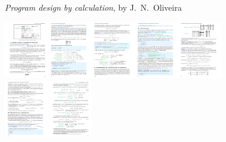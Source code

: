 \begin{figure}
\begin{centering}
\emph{Program design by calculation}, by J.~N.~Oliveira
\par\end{centering}
\begin{centering}
\vspace{1\baselineskip}
\par\end{centering}
\begin{centering}
\includegraphics[height=2.51cm]{random-pages/random-pages-from-sofp-pdf-00}\includegraphics[height=2.51cm]{random-pages/random-pages-from-sofp-pdf-01}\includegraphics[height=2.51cm]{random-pages/random-pages-from-sofp-pdf-02}\includegraphics[height=2.51cm]{random-pages/random-pages-from-sofp-pdf-05}\includegraphics[height=2.51cm]{random-pages/random-pages-from-sofp-pdf-06}\includegraphics[height=2.51cm]{random-pages/random-pages-from-sofp-pdf-07}\includegraphics[height=2.51cm]{random-pages/random-pages-from-sofp-pdf-08}
\par\end{centering}
\vspace{-0.3\baselineskip}


\end{figure}
